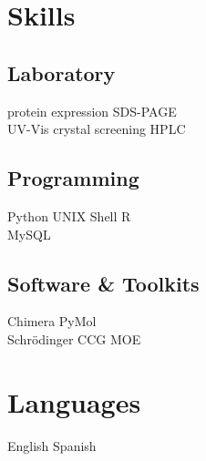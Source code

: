 \documentclass[]{deedy-resume-openfont}
\begin{document}
\begin{minipage}[t]{0.33\textwidth}

\section{Skills}

\subsection{Laboratory}
 \textbullet{} protein expression
 \textbullet{} SDS-PAGE\\
 \textbullet{} UV-Vis
 \textbullet{} crystal screening
 \textbullet{} HPLC\\
\sectionsep

\subsection{Programming}
 \textbullet{} Python
 \textbullet{} UNIX Shell
 \textbullet{} R \\
 \textbullet{} MySQL
\sectionsep

\subsection{Software \& Toolkits}
 \textbullet{} Chimera
 \textbullet{} PyMol\\
 \textbullet{} Schrödinger
 \textbullet{} CCG MOE
 \\
\sectionsep


\section{Languages}
 \textbullet{}   English \textbullet{} Spanish \\


\end{minipage} 
\end{document}
